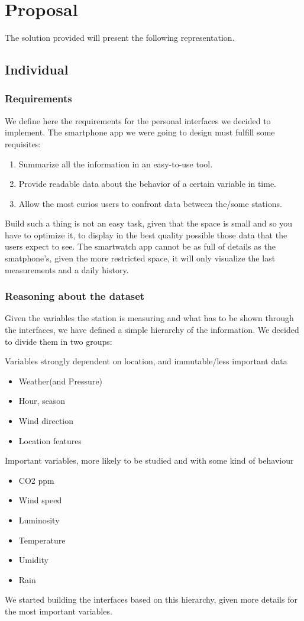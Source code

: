 \documentclass[12pt]{article} %
\begin{document}
\section{Proposal}
The solution provided will present the following representation. 
\subsection{Individual}
\subsubsection{Requirements}
We define here the requirements for the personal interfaces we decided to implement.
The smartphone app we were going to design must fulfill some requisites:
\begin{enumerate}
	\item Summarize all the information in an easy-to-use tool.
	\item Provide readable data about the behavior of a certain variable in time.
	\item Allow the most curios users to confront data between the/some stations.
\end{enumerate}
Build such a thing is not an easy task, given that the space is small and so you have to optimize it, to display in the best quality possible those data that the users
expect to see.
The smartwatch app cannot be as full of details as the smatphone's, given the more restricted space, it will only visualize the last measurements and a  daily history.
\subsubsection{Reasoning about the dataset}
Given the variables the station is measuring and what has to be shown through the interfaces, we have defined a simple hierarchy of the information.
We decided to divide them in two groups:
\begin{description}
\item Variables strongly dependent on location, and immutable/less important data
	\begin{itemize}	
	\item Weather(and Pressure)
	\item Hour, season
	\item Wind direction
	\item Location features
	\end{itemize}
\item Important variables, more likely to be studied and with some kind of behaviour
	\begin{itemize}
	\item CO2 ppm
	\item Wind speed
	\item Luminosity
	\item Temperature
	\item Umidity
	\item Rain
	\end{itemize}
\end{description}
We started building the interfaces based on this hierarchy, given more details for the most important variables.
\end{document}
